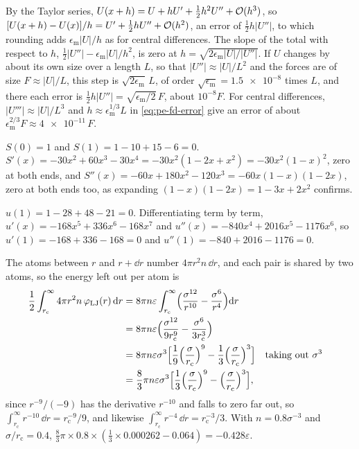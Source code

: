By the Taylor series, $U(x + h) = U + hU' +
\frac12 h^2U'' + \mathcal{O}(h^3)$, so $[U(x + h) - U(x)]/h = U' + \frac12 hU''
+ \mathcal{O}(h^2)$, an error of $\frac12 h\lvert U''\rvert$, to which rounding
adds $\epsilon_{\mathrm m}\lvert U\rvert/h$ as for central differences.
The slope of the total with respect to $h$, $\frac12\lvert U''\rvert -
\epsilon_{\mathrm m}\lvert U\rvert/h^2$, is zero at $h = \sqrt{2
\epsilon_{\mathrm m}\lvert U\rvert/\lvert U''\rvert}$. If $U$ changes by
about its own size over a length $L$, so that $\lvert U''\rvert \approx
\lvert U\rvert/L^2$ and the forces are of size $F \approx \lvert U\rvert/
L$, this step is $\sqrt{2\epsilon_{\mathrm m}}\,L$, of order
$\sqrt{\epsilon_{\mathrm m}} = \num{1.5e-8}$ times $L$, and there each
error is $\frac12 h\lvert U''\rvert = \sqrt{\epsilon_{\mathrm m}/2}\,F$,
about $10^{-8}F$. For central differences, $\lvert U'''\rvert \approx
\lvert U\rvert/L^3$ and $h \approx \epsilon_{\mathrm m}^{1/3}L$ in
\cref{eq:pe-fd-error} give an error of about $\epsilon_{\mathrm m}^{2/3}F
\approx \num{4e-11}\,F$.

$S(0) = 1$ and $S(1) = 1 - 10 + 15 - 6 = 0$.
$S'(x) = -30x^2 + 60x^3 - 30x^4 = -30x^2(1 - 2x + x^2) = -30x^2(1 -
x)^2$, zero at both ends,
and $S''(x) = -60x + 180x^2 - 120x^3 = -60x(1 - x)(1 - 2x)$, zero at both
ends too, as expanding $(1 - x)(1 - 2x) = 1 - 3x + 2x^2$ confirms.

$u(1) = 1 - 28 + 48 - 21 = 0$. Differentiating
term by term, $u'(x) = -168x^5 + 336x^6 - 168x^7$ and $u''(x) = -840x^4 +
2016x^5 - 1176x^6$, so $u'(1) = -168 + 336 - 168 = 0$ and $u''(1) = -840
+ 2016 - 1176 = 0$.

The atoms between $r$ and $r + \dd r$ number
$4\pi r^2n\,\dd r$, and each pair is shared by two atoms, so the energy
left out per atom is
\begin{align*}
   \frac12\int_{r_{\mathrm c}}^{\infty}4\pi r^2n\,\varphi_{\mathrm{LJ}}(r)
   \,\mathrm{d} r
   &= 8\pi n\varepsilon\int_{r_{\mathrm c}}^{\infty}\Bigl(
   \frac{\sigma^{12}}{r^{10}} - \frac{\sigma^6}{r^4}\Bigr)\mathrm{d} r\\
   &= 8\pi n\varepsilon\Bigl(\frac{\sigma^{12}}{9r_{\mathrm c}^9}
   - \frac{\sigma^6}{3r_{\mathrm c}^3}\Bigr)\\
   &= 8\pi n\varepsilon\sigma^3\Bigl[\frac19\Bigl(\frac{\sigma}
   {r_{\mathrm c}}\Bigr)^9 - \frac13\Bigl(\frac{\sigma}{r_{\mathrm c}}
   \Bigr)^3\Bigr]
   && \text{taking out $\sigma^3$}\\
   &= \frac83\pi n\varepsilon\sigma^3\Bigl[\frac13\Bigl(\frac{\sigma}
   {r_{\mathrm c}}\Bigr)^9 - \Bigl(\frac{\sigma}{r_{\mathrm c}}\Bigr)^3
   \Bigr] ,
\end{align*}
since $r^{-9}/(-9)$ has the derivative $r^{-10}$ and falls to zero far
out, so $\int_{r_{\mathrm c}}^\infty r^{-10}\,\dd r = r_{\mathrm c}^{-9}/
9$, and likewise $\int_{r_{\mathrm c}}^\infty r^{-4}\,\dd r = r_{\mathrm
c}^{-3}/3$. With $n = 0.8\sigma^{-3}$ and $\sigma/r_{\mathrm c} = 0.4$,
$\frac83\pi\times0.8\times(\frac13\times0.000262 - 0.064) =
-0.428\varepsilon$.

